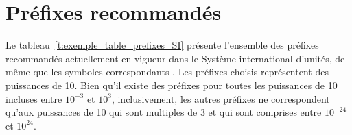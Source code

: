 \section{Préfixes recommandés}

Le tableau~\ref{t:exemple_table_prefixes_SI} présente l'ensemble des préfixes recommandés actuellement en vigueur dans le Système international d'unités, de même que les symboles correspondants \cite{BIP98}. Les préfixes choisis représentent des puissances de 10. Bien qu'il existe des préfixes pour toutes les puissances de 10 incluses entre $10^{-3}$ et $10^{3}$, inclusivement, les autres préfixes ne correspondent qu'aux puissances de 10 qui sont multiples de 3 et qui sont comprises entre $10^{-24}$ et $10^{24}$.

\begin{table}
  \centering
  \caption{Préfixes et symboles du Système international d'unités (SI). Les préfixes anglais sont les mêmes que les français, en leur retirant toutefois les accents.}
  \label{t:exemple_table_prefixes_SI}
\end{table}
